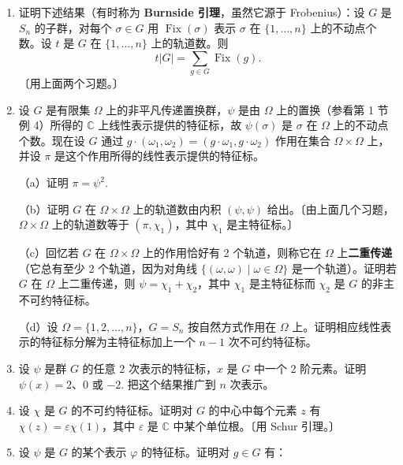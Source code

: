 \begin{enumerate}
（c）设 \(W = \{v \in V \mid \varphi(g)(v) = v \text{ 对所有 } g \in G\}\) 是 \(V\) 中被 \(G\) 的所有元素逐点固定的子空间。推出 \(\dim W = t\)，即 \(G\) 在 \(\mathcal{B}\) 上的轨道数。

\item 证明下述结果（有时称为 \textbf{Burnside 引理}，虽然它源于 Frobenius）：设 \(G\) 是 \(S_n\) 的子群，对每个 \(\sigma \in G\) 用 \(\operatorname{Fix}(\sigma)\) 表示 \(\sigma\) 在 \(\{1, \ldots, n\}\) 上的不动点个数。设 \(t\) 是 \(G\) 在 \(\{1, \ldots, n\}\) 上的轨道数。则
\[
t|G| = \sum_{g \in G}\operatorname{Fix}(g).
\]
〔用上面两个习题。〕

\item 设 \(G\) 是有限集 \(\Omega\) 上的非平凡传递置换群，\(\psi\) 是由 \(\Omega\) 上的置换（参看第 1 节例 4）所得的 \(\mathbb{C}\) 上线性表示提供的特征标，故 \(\psi(\sigma)\) 是 \(\sigma\) 在 \(\Omega\) 上的不动点个数。现在设 \(G\) 通过 \(g \cdot (\omega_1, \omega_2) = (g \cdot \omega_1, g \cdot \omega_2)\) 作用在集合 \(\Omega \times \Omega\) 上，并设 \(\pi\) 是这个作用所得的线性表示提供的特征标。

（a）证明 \(\pi = \psi^2\).

（b）证明 \(G\) 在 \(\Omega \times \Omega\) 上的轨道数由内积 \((\psi, \psi)\) 给出。〔由上面几个习题，\(\Omega \times \Omega\) 上的轨道数等于 \((\pi, \chi_1)\)，其中 \(\chi_1\) 是主特征标。〕

（c）回忆若 \(G\) 在 \(\Omega \times \Omega\) 上的作用恰好有 2 个轨道，则称它在 \(\Omega\) 上\textbf{二重传递}（它总有至少 2 个轨道，因为对角线 \(\{(\omega, \omega) \mid \omega \in \Omega\}\) 是一个轨道）。证明若 \(G\) 在 \(\Omega\) 上二重传递，则 \(\psi = \chi_1+\chi_2\)，其中 \(\chi_1\) 是主特征标而 \(\chi_2\) 是 \(G\) 的非主不可约特征标。

（d）设 \(\Omega = \{1, 2, \ldots, n\}\)，\(G = S_n\) 按自然方式作用在 \(\Omega\) 上。证明相应线性表示的特征标分解为主特征标加上一个 \(n-1\) 次不可约特征标。

\item 设 \(\psi\) 是群 \(G\) 的任意 2 次表示的特征标，\(x\) 是 \(G\) 中一个 2 阶元素。证明 \(\psi(x) = 2\)、0 或 \(-2\). 把这个结果推广到 \(n\) 次表示。

\item 设 \(\chi\) 是 \(G\) 的不可约特征标。证明对 \(G\) 的中心中每个元素 \(z\) 有 \(\chi(z) = \varepsilon\chi(1)\)，其中 \(\varepsilon\) 是 \(\mathbb{C}\) 中某个单位根。〔用 Schur 引理。〕

\item 设 \(\psi\) 是 \(G\) 的某个表示 \(\varphi\) 的特征标。证明对 \(g \in G\) 有：


\end{enumerate}
